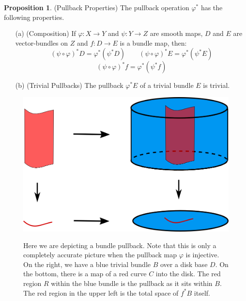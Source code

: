 \documentclass[12pt]{article}
\theoremstyle{definition}
\newtheorem{proposition}[theorem]{Proposition}
\numberwithin{equation}{section}
\begin{document}
\begin{proposition} \label{prop:pullback_properties} (Pullback Properties) The pullback operation $\varphi^*$ has the following properties.

\begin{enumerate}
	\item[(a)] (Composition) If $\varphi:X \to Y$ and $\psi:Y \to Z$ are smooth maps, $D$ and $E$ are vector-bundles on $Z$ and $f:D \to E$ is a bundle map, then:
	\[
	(\psi \circ \varphi)^*D = \varphi^*(\psi^*D) \qquad (\psi \circ \varphi)^*E = \varphi^*(\psi^*E)
	\]
	\[
	(\psi \circ \varphi)^*f = \varphi^*(\psi^*f)
	\]
	\item[(b)] (Trivial Pullbacks) The pullback $\varphi^*E$ of a trivial bundle $E$ is trivial.
\end{enumerate}
\end{proposition}

\begin{figure}[h]
    \centering
    \includegraphics[width=.5\textwidth]{reu_figures/maps_of_bundles_3.png}
    \label{fig:maps_of_bundles_3}
    \caption{Here we are depicting a bundle pullback. Note that this is only a completely accurate picture when the pullback map $\varphi$ is injective. On the right, we have a blue trivial bundle $B$ over a disk base $D$. On the bottom, there is a map of a red curve $C$ into the disk. The red region $R$ within the blue bundle is the pullback as it sits within $B$. The red region in the upper left is the total space of $f^*B$ itself.}
\end{figure}
\end{document}

